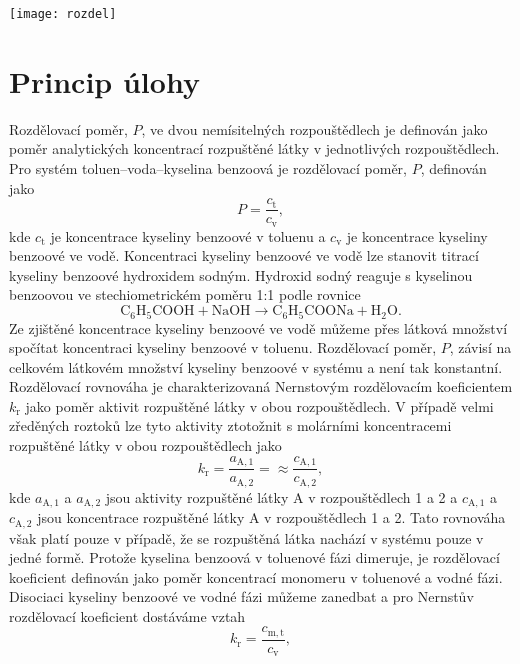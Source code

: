 \documentclass[12pt,a4paper]{article}
\def\ri#1{\mathrm{#1}}
\begin{document}
\begin{center}
\texttt{[image: rozdel]}
\end{center}
\section*{Princip úlohy}
Rozdělovací poměr, $P$, ve dvou nemísitelných rozpouštědlech je definován jako poměr analytických koncentrací rozpuštěné látky v jednotlivých rozpouštědlech. Pro systém toluen--voda--kyselina benzoová je rozdělovací poměr, $P$, definován jako
\begin{equation}
	P = \dfrac{c_\ri{t}}{c_\ri{v}},
\end{equation}
kde $c_\ri{t}$ je koncentrace kyseliny benzoové v toluenu a $c_\ri{v}$ je koncentrace kyseliny benzoové ve vodě. Koncentraci kyseliny benzoové ve vodě lze stanovit titrací kyseliny benzoové hydroxidem sodným. Hydroxid sodný reaguje s kyselinou benzoovou ve stechiometrickém poměru 1:1 podle rovnice
\begin{equation}
	\ri{C_6H_5COOH + NaOH}\rightarrow \ri{C_6H_5COONa + H_2O}.
\end{equation}
Ze zjištěné koncentrace kyseliny benzoové ve vodě můžeme přes látková množství spočítat koncentraci kyseliny benzoové v toluenu. Rozdělovací poměr, $P$, závisí na celkovém látkovém množství kyseliny benzoové v systému a není tak konstantní.\\
Rozdělovací rovnováha je charakterizovaná Nernstovým rozdělovacím koeficientem $k_\ri{r}$ jako poměr aktivit rozpuštěné látky v obou rozpouštědlech. V případě velmi zředěných roztoků lze tyto aktivity ztotožnit s molárními koncentracemi rozpuštěné látky v obou rozpouštědlech jako 
\begin{equation}
	k_\ri{r} = \dfrac{a_\ri{A, 1}}{a_\ri{A, 2}} = \approx \dfrac{c_\ri{A, 1}}{c_\ri{A, 2}}, 
\end{equation}
kde $a_\ri{A, 1}$ a $a_\ri{A, 2}$ jsou aktivity rozpuštěné látky A v rozpouštědlech 1 a 2 a $c_\ri{A, 1}$ a $c_\ri{A, 2}$ jsou koncentrace rozpuštěné látky A v rozpouštědlech 1 a 2. Tato rovnováha však platí pouze v případě, že se rozpuštěná látka nachází v systému pouze v jedné formě. Protože kyselina benzoová v toluenové fázi dimeruje, je rozdělovací koeficient definován jako poměr koncentrací monomeru v toluenové a vodné fázi. Disociaci kyseliny benzoové ve vodné fázi můžeme zanedbat a pro Nernstův rozdělovací koeficient dostáváme vztah
\begin{equation}
	k_\ri{r} = \dfrac{c_\ri{m, t}}{c_\ri{v}},
\end{equation}
\end{document}
